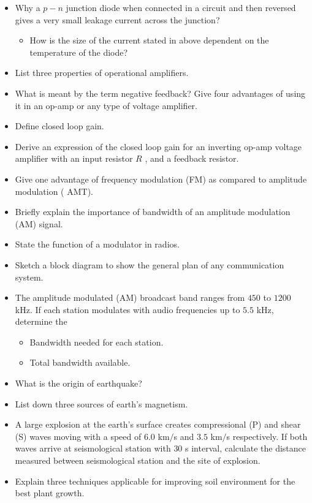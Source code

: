 \documentclass{article}
\begin{document}
\begin{itemize}
\item Why a $ p-n$ junction diode when connected in a circuit and then reversed gives a very small leakage current across the junction? 
 \begin{itemize}
\item How is the size of the current stated in above dependent on the temperature of the diode?
\end{itemize}
\item List three properties of operational amplifiers.
\item What is meant by the term negative feedback? Give four advantages of using it in an op-amp or any type of voltage amplifier.
\item Define closed loop gain. 
\item Derive an expression of the closed loop gain for an inverting op-amp voltage amplifier with an input resistor $ R$ , and a feedback resistor.
\item Give one advantage of frequency modulation (FM) as compared to amplitude modulation ( AMT).
\item Briefly explain the importance of bandwidth of an amplitude modulation (AM) signal.
\item State the function of a modulator in radios.
\item Sketch a block diagram to show the general plan of any communication system.
\item The amplitude modulated (AM) broadcast band ranges from $ 450$ to $ 1200$ kHz. If each station modulates with audio frequencies up to $ 5.5$ kHz, determine the
 \begin{itemize}
\item  Bandwidth needed for each station.
\item  Total bandwidth available. 
\end{itemize}
\item What is the origin of earthquake?
\item List down three sources of earth's magnetism. 
\item A large explosion at the earth's surface creates compressional (P) and shear (S) waves moving with a speed of $ 6.0$ km$/$s and $ 3.5$ km$/$s respectively. If both waves arrive at seismological station with $ 30$ s interval, calculate the distance measured between seismological station and the site of explosion. 
\item Explain three techniques applicable for improving soil environment for the best plant growth.
\end{itemize}
\end{document}
